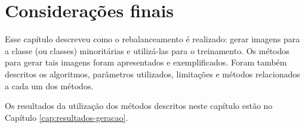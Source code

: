 %
%


\section{Considerações finais}

Esse capítulo descreveu como o rebalanceamento é realizado: gerar imagens para a classe (ou classes) minoritárias e utilizá-las para o treinamento. Os métodos para gerar tais imagens foram apresentados e exemplificados. Foram também descritos os algoritmos, parâmetros utilizados, limitações e métodos relacionados a cada um dos métodos.

Os resultados da utilização dos métodos descritos neste capítulo estão no Capítulo \ref{cap:resultados-geracao}.

